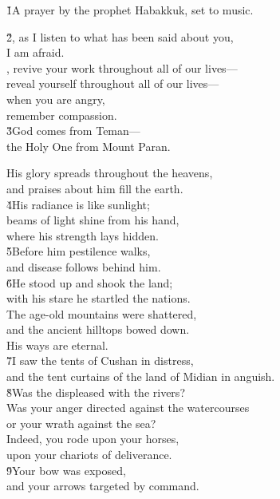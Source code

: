 \v{1}A prayer by the prophet Habakkuk, set to music.

\begin{poetry}
\poeml \v{2}, as I listen to what has been said about you, \\
\poemll    I am afraid. \\
\poeml {}, revive your work throughout all of our lives--- \\
\poemll    reveal yourself throughout all of our lives--- \\
\poeml when you are angry, \\
\poemll    remember compassion. \\
\poeml \v{3}God comes from Teman--- \\
\poemll    the Holy One from Mount Paran.
\end{poetry}

\begin{poetry}
\poeml His glory spreads throughout the heavens, \\
\poemll    and praises about him fill the earth. \\
\poeml \v{4}His radiance is like sunlight; \\
\poemll    beams of light shine from his hand, \\
\poemlll       where his strength lays hidden. \\
\poeml \v{5}Before him pestilence walks, \\
\poemll    and disease follows behind him. \\
\poeml \v{6}He stood up and shook the land; \\
\poemll    with his stare he startled the nations. \\
\poeml The age-old mountains were shattered, \\
\poemll    and the ancient hilltops bowed down. \\
\poeml His ways are eternal. \\
\poeml \v{7}I saw the tents of Cushan in distress, \\
\poemll    and the tent curtains of the land of Midian in anguish. \\
\poeml \v{8}Was the  displeased with the rivers? \\
\poemll    Was your anger directed against the watercourses \\
\poemlll       or your wrath against the sea? \\
\poeml Indeed, you rode upon your horses, \\
\poemll    upon your chariots of deliverance. \\
\poeml \v{9}Your bow was exposed, \\
\poemll    and your arrows targeted by command.
\end{poetry}

